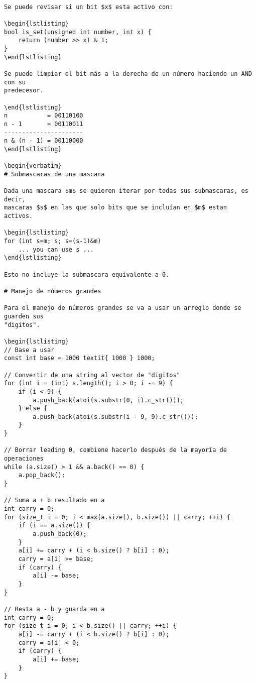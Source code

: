\documentclass[11pt]{article}
\begin{document}
\begin{verbatim}  

Se puede revisar si un bit $x$ esta activo con:

\begin{lstlisting}
bool is_set(unsigned int number, int x) {
    return (number >> x) & 1;
}
\end{lstlisting}

Se puede limpiar el bit más a la derecha de un número haciendo un AND con su
predecesor.
 
\end{lstlisting}
n           = 00110100
n - 1       = 00110011
----------------------
n & (n - 1) = 00110000
\end{lstlisting}

\begin{verbatim}
# Submascaras de una mascara

Dada una mascara $m$ se quieren iterar por todas sus submascaras, es decir,
mascaras $s$ en las que solo bits que se incluían en $m$ estan activos.

\begin{lstlisting}
for (int s=m; s; s=(s-1)&m)
    ... you can use s ...
\end{lstlisting}

Esto no incluye la submascara equivalente a 0.

# Manejo de números grandes

Para el manejo de números grandes se va a usar un arreglo donde se guarden sus
"digitos".

\begin{lstlisting}
// Base a usar
const int base = 1000 textit{ 1000 } 1000;

// Convertir de una string al vector de "digitos"
for (int i = (int) s.length(); i > 0; i -= 9) {
    if (i < 9) {
        a.push_back(atoi(s.substr(0, i).c_str()));
    } else {
        a.push_back(atoi(s.substr(i - 9, 9).c_str()));
    }
}

// Borrar leading 0, combiene hacerlo después de la mayoría de operaciones
while (a.size() > 1 && a.back() == 0) {
    a.pop_back();
}

// Suma a + b resultado en a
int carry = 0;
for (size_t i = 0; i < max(a.size(), b.size()) || carry; ++i) {
    if (i == a.size()) {
        a.push_back(0);
    }
    a[i] += carry + (i < b.size() ? b[i] : 0);
    carry = a[i] >= base;
    if (carry) {
        a[i] -= base;
    }
}

// Resta a - b y guarda en a
int carry = 0;
for (size_t i = 0; i < b.size() || carry; ++i) {
    a[i] -= carry + (i < b.size() ? b[i] : 0);
    carry = a[i] < 0;
    if (carry) {
        a[i] += base;
    }
}


\end{verbatim}
\end{document}
